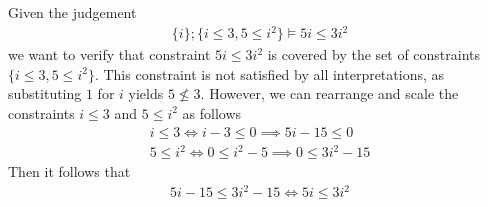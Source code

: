 %
\begin{examp}\label{example:needconic}
    Given the judgement
    \begin{align*}
        \{i\};\{i \leq 3, 5 \leq i^2\} \vDash 5i \leq 3i^2
    \end{align*}
    we want to verify that constraint $5i \leq 3i^2$ is covered by the set of constraints $\{i\leq 3, 5 \leq i^2\}$. This constraint is not satisfied by all interpretations, as substituting $1$ for $i$ yields $5 \not\leq 3$. However, we can rearrange and scale the constraints $i\leq 3$ and $5\leq i^2$ as follows
    \begin{align*}
        i \leq 3 \iff i-3\leq 0 \implies 5i - 15 \leq 0\\
        5\leq i^2 \iff 0 \leq i^2-5 \implies 0 \leq 3i^2-15
    \end{align*}
    Then it follows that
    \begin{align*}
        5i-15 \leq 3i^2-15 \iff 5i \leq 3i^2
    \end{align*}
\end{examp}
%